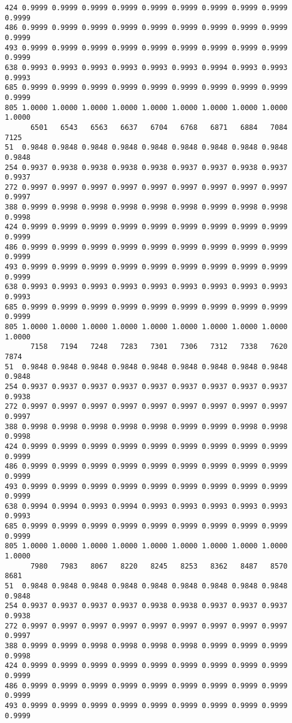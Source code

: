\documentclass[
]{report}
\begin{document}
\begin{verbatim}
424 0.9999 0.9999 0.9999 0.9999 0.9999 0.9999 0.9999 0.9999 0.9999 0.9999
486 0.9999 0.9999 0.9999 0.9999 0.9999 0.9999 0.9999 0.9999 0.9999 0.9999
493 0.9999 0.9999 0.9999 0.9999 0.9999 0.9999 0.9999 0.9999 0.9999 0.9999
638 0.9993 0.9993 0.9993 0.9993 0.9993 0.9993 0.9994 0.9993 0.9993 0.9993
685 0.9999 0.9999 0.9999 0.9999 0.9999 0.9999 0.9999 0.9999 0.9999 0.9999
805 1.0000 1.0000 1.0000 1.0000 1.0000 1.0000 1.0000 1.0000 1.0000 1.0000
      6501   6543   6563   6637   6704   6768   6871   6884   7084   7125
51  0.9848 0.9848 0.9848 0.9848 0.9848 0.9848 0.9848 0.9848 0.9848 0.9848
254 0.9937 0.9938 0.9938 0.9938 0.9938 0.9937 0.9937 0.9938 0.9937 0.9937
272 0.9997 0.9997 0.9997 0.9997 0.9997 0.9997 0.9997 0.9997 0.9997 0.9997
388 0.9999 0.9998 0.9998 0.9998 0.9998 0.9998 0.9999 0.9998 0.9998 0.9998
424 0.9999 0.9999 0.9999 0.9999 0.9999 0.9999 0.9999 0.9999 0.9999 0.9999
486 0.9999 0.9999 0.9999 0.9999 0.9999 0.9999 0.9999 0.9999 0.9999 0.9999
493 0.9999 0.9999 0.9999 0.9999 0.9999 0.9999 0.9999 0.9999 0.9999 0.9999
638 0.9993 0.9993 0.9993 0.9993 0.9993 0.9993 0.9993 0.9993 0.9993 0.9993
685 0.9999 0.9999 0.9999 0.9999 0.9999 0.9999 0.9999 0.9999 0.9999 0.9999
805 1.0000 1.0000 1.0000 1.0000 1.0000 1.0000 1.0000 1.0000 1.0000 1.0000
      7158   7194   7248   7283   7301   7306   7312   7338   7620   7874
51  0.9848 0.9848 0.9848 0.9848 0.9848 0.9848 0.9848 0.9848 0.9848 0.9848
254 0.9937 0.9937 0.9937 0.9937 0.9937 0.9937 0.9937 0.9937 0.9937 0.9938
272 0.9997 0.9997 0.9997 0.9997 0.9997 0.9997 0.9997 0.9997 0.9997 0.9997
388 0.9998 0.9998 0.9998 0.9998 0.9998 0.9999 0.9999 0.9998 0.9998 0.9998
424 0.9999 0.9999 0.9999 0.9999 0.9999 0.9999 0.9999 0.9999 0.9999 0.9999
486 0.9999 0.9999 0.9999 0.9999 0.9999 0.9999 0.9999 0.9999 0.9999 0.9999
493 0.9999 0.9999 0.9999 0.9999 0.9999 0.9999 0.9999 0.9999 0.9999 0.9999
638 0.9994 0.9994 0.9993 0.9994 0.9993 0.9993 0.9993 0.9993 0.9993 0.9993
685 0.9999 0.9999 0.9999 0.9999 0.9999 0.9999 0.9999 0.9999 0.9999 0.9999
805 1.0000 1.0000 1.0000 1.0000 1.0000 1.0000 1.0000 1.0000 1.0000 1.0000
      7980   7983   8067   8220   8245   8253   8362   8487   8570   8681
51  0.9848 0.9848 0.9848 0.9848 0.9848 0.9848 0.9848 0.9848 0.9848 0.9848
254 0.9937 0.9937 0.9937 0.9937 0.9938 0.9938 0.9937 0.9937 0.9937 0.9938
272 0.9997 0.9997 0.9997 0.9997 0.9997 0.9997 0.9997 0.9997 0.9997 0.9997
388 0.9999 0.9999 0.9998 0.9998 0.9998 0.9998 0.9999 0.9999 0.9999 0.9998
424 0.9999 0.9999 0.9999 0.9999 0.9999 0.9999 0.9999 0.9999 0.9999 0.9999
486 0.9999 0.9999 0.9999 0.9999 0.9999 0.9999 0.9999 0.9999 0.9999 0.9999
493 0.9999 0.9999 0.9999 0.9999 0.9999 0.9999 0.9999 0.9999 0.9999 0.9999

\end{verbatim}
\end{document}
